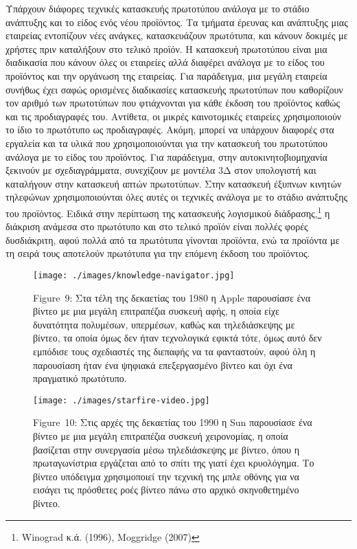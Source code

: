 \documentclass[
]{article}
\begin{document}
Υπάρχουν διάφορες τεχνικές κατασκευής πρωτοτύπου ανάλογα με το στάδιο
ανάπτυξης και το είδος ενός νέου προϊόντος. Τα τμήματα έρευνας και
ανάπτυξης μιας εταιρείας εντοπίζουν νέες ανάγκες, κατασκευάζουν
πρωτότυπα, και κάνουν δοκιμές με χρήστες πριν καταλήξουν στο τελικό
προϊόν. Η κατασκευή πρωτοτύπου είναι μια διαδικασία που κάνουν όλες οι
εταιρείες αλλά διαφέρει ανάλογα με το είδος του προϊόντος και την
οργάνωση της εταιρείας. Για παράδειγμα, μια μεγάλη εταιρεία συνήθως έχει
σαφώς ορισμένες διαδικασίες κατασκευής πρωτοτύπων που καθορίζουν τον
αριθμό των πρωτοτύπων που φτιάχνονται για κάθε έκδοση του προϊόντος
καθώς και τις προδιαγραφές του. Αντίθετα, οι μικρές καινοτομικές
εταιρείες χρησιμοποιούν το ίδιο το πρωτότυπο ως προδιαγραφές. Ακόμη,
μπορεί να υπάρχουν διαφορές στα εργαλεία και τα υλικά που
χρησιμοποιούνται για την κατασκευή του πρωτοτύπου ανάλογα με το είδος
του προϊόντος. Για παράδειγμα, στην αυτοκινητοβιομηχανία ξεκινούν με
σχεδιαγράμματα, συνεχίζουν με μοντέλα 3Δ στον υπολογιστή και καταλήγουν
στην κατασκευή απτών πρωτοτύπων. Στην κατασκευή έξυπνων κινητών
τηλεφώνων χρησιμοποιούνται όλες αυτές οι τεχνικές ανάλογα με το στάδιο
ανάπτυξης του προϊόντος. Ειδικά στην περίπτωση της κατασκευής λογισμικού
διάδρασης,\footnote{Winograd κ.ά. (1996), Moggridge (2007)} η διάκριση
ανάμεσα στο πρωτότυπο και στο τελικό προϊόν είναι πολλές φορές
δυσδιάκριτη, αφού πολλά από τα πρωτότυπα γίνονται προϊόντα, ενώ τα
προϊόντα με τη σειρά τους αποτελούν πρωτότυπα για την επόμενη έκδοση του
προϊόντος.

\leavevmode{}%
\begin{figure}
\hypertarget{fig:knowledge-navigator}{%
\centering
\texttt{[image: ./images/knowledge-navigator.jpg]}
\caption{Figure~9: Στα τέλη της δεκαετίας του 1980 η Apple παρουσίασε
ένα βίντεο με μια μεγάλη επιτραπέζια συσκευή αφής, η οποία είχε
δυνατότητα πολυμέσων, υπερμέσων, καθώς και τηλεδιάσκεψης με βίντεο, τα
οποία όμως δεν ήταν τεχνολογικά εφικτά τότε, όμως αυτό δεν εμπόδισε τους
σχεδιαστές της διεπαφής να τα φανταστούν, αφού όλη η παρουσίαση ήταν ένα
ψηφιακά επεξεργασμένο βίντεο και όχι ένα πραγματικό
πρωτότυπο.}\label{fig:knowledge-navigator}
}
\end{figure}

\leavevmode{}%
\begin{figure}
\hypertarget{fig:starfire-video}{%
\centering
\texttt{[image: ./images/starfire-video.jpg]}
\caption{Figure~10: Στις αρχές της δεκαετίας του 1990 η Sun παρουσίασε
ένα βίντεο με μια μεγάλη επιτραπέζια συσκευή χειρονομίας, η οποία
βασίζεται στην συνεργασία μέσω τηλεδιάσκεψης με βίντεο, όπου η
πρωταγωνίστρια εργάζεται από το σπίτι της γιατί έχει κρυολόγημα. Το
βίντεο υπόδειγμα χρησιμοποιεί την τεχνική της μπλε οθόνης για να εισάγει
τις πρόσθετες ροές βίντεο πάνω στο αρχικό σκηνοθετημένο
βίντεο.}\label{fig:starfire-video}
}
\end{figure}
\end{document}
